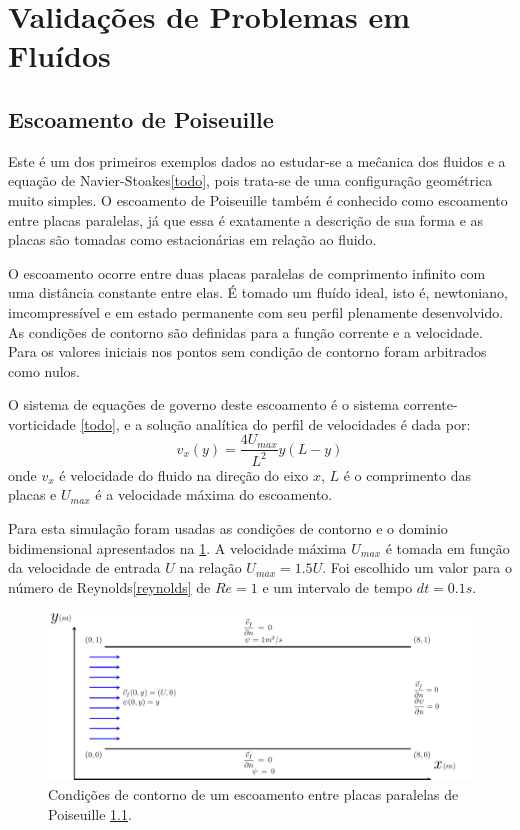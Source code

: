 \section{\textbf{Validações de Problemas em Fluídos}}
\label{sec_fluidos}
\subsection{\textbf{Escoamento de Poiseuille}}
\label{sec_poiseuille}
Este é um dos primeiros exemplos dados ao estudar-se a meĉanica dos fluidos e a equação de Navier-Stoakes\eqref{todo}, pois trata-se de uma configuração geométrica muito simples.
O escoamento de Poiseuille também é conhecido como escoamento entre placas paralelas, já que essa é exatamente a descrição de sua forma e as placas são tomadas como estacionárias em relação ao fluido.

O escoamento ocorre entre duas placas paralelas de comprimento infinito com uma distância constante entre elas.
É tomado um fluído ideal, isto é, newtoniano, imcompressível e em estado permanente com seu perfil plenamente desenvolvido.
As condições de contorno são definidas para a função corrente e a velocidade.
Para os valores iniciais nos pontos sem condição de contorno foram arbitrados como nulos.

O sistema de equações de governo deste escoamento é o sistema corrente-vorticidade \ref{todo}, e a solução analítica do perfil de velocidades é dada por\cite{pontes_norberto}:
\begin{equation}
    v_x(y) = \dfrac{4U_{max}}{L^2}y(L-y)
    \label{poiseuille_sol} 
\end{equation}
onde $v_x$ é velocidade do fluido na direção do eixo $x$, $L$ é o comprimento das placas e $U_{max}$ é a velocidade máxima do escoamento.

Para esta simulação foram usadas as condições de contorno e o dominio bidimensional apresentados na \ref{poiseuille_bc}.
A velocidade máxima $U_{max}$ é tomada em função da velocidade de entrada $U$ na relação $U_{max}=1.5U$.
Foi escolhido um valor para o número de Reynolds\eqref{reynolds} de $Re=1$ e um intervalo de tempo $dt=0.1s$.
\begin{figure}[H]
    \centering
    \includegraphics[width=\linewidth]{figures/Poiseuille_boundary_conditions.pdf}
    \caption{Condições de contorno de um escoamento entre placas paralelas de Poiseuille \ref{sec_poiseuille}.}
    \label{poiseuille_bc}
\end{figure}

